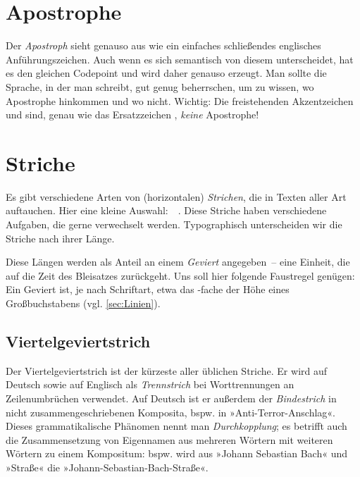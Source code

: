 \section{Apostrophe}

Der \emph{Apostroph}  sieht genauso aus wie ein einfaches schließendes
englisches Anführungszeichen. Auch wenn es sich semantisch von diesem
unterscheidet, hat es den gleichen Codepoint und wird daher genauso erzeugt.
Man sollte die Sprache, in der man schreibt, gut genug beherrschen, um zu
wissen, wo Apostrophe hinkommen und wo nicht.  Wichtig: Die freistehenden
Akzentzeichen \Char{\textasciigrave} und  sind, genau wie das
Ersatzzeichen \Char{\textquotesingle}, \emph{keine} Apostrophe!

\section{Striche}
\label{sec:Striche}

Es gibt verschiedene Arten von (horizontalen) \emph{Strichen}, die in Texten
aller Art auftauchen.  Hier eine kleine Auswahl:
\Char{-}\,\Char{--}\,\Char{---}\,\Char{$-$}\,\Char{$=$}.  Diese Striche haben
verschiedene Aufgaben, die gerne verwechselt werden.  Typographisch
unterscheiden wir die Striche nach ihrer Länge.

Diese Längen werden als Anteil an einem \emph{Geviert} angegeben~--
eine Einheit, die auf die Zeit des Bleisatzes zurückgeht.  Uns soll
hier folgende Faustregel genügen: Ein Geviert ist, je nach Schriftart,
etwa das -fache der Höhe eines Großbuchstabens
(vgl. \cref{sec:Linien}).

\subsection{Viertelgeviertstrich}
\label{subsec:Viertel}

Der Viertelgeviertstrich \Char{-} ist der kürzeste aller üblichen
Striche.  Er wird auf Deutsch sowie auf Englisch als \emph{Trennstrich} bei
Worttrennungen an Zeilenumbrüchen verwendet.  Auf Deutsch ist er außerdem der
\emph{Bindestrich} in nicht zusammenge\-schriebenen Komposita, bspw. in
»Anti-Terror-Anschlag«.  Dieses grammatikalische Phänomen nennt man
\emph{Durchkopplung}; es betrifft auch die Zusammensetzung von Eigennamen aus
mehreren Wörtern mit weiteren Wörtern zu einem Kompositum: bspw. wird aus
»Johann Sebastian Bach« und »Straße« die »Johann-Sebastian-Bach-Straße«.

